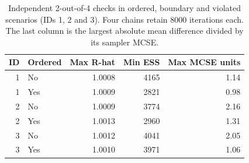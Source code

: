 \begin{table}[htbp]
\centering
\caption{Independent 2-out-of-4 checks in ordered, boundary and violated scenarios (IDs 1, 2 and 3). Four chains retain 8000 iterations each. The last column is the largest absolute mean difference divided by its sampler MCSE.}\label{tab:mcmc-extra}
\small
\begin{tabular}{rlrrr}
\toprule
ID & Ordered & Max R-hat & Min ESS & Max MCSE units \\
\midrule
1 & No & 1.0008 & 4165 & 1.14 \\
1 & Yes & 1.0009 & 2821 & 0.98 \\
2 & No & 1.0009 & 3774 & 2.16 \\
2 & Yes & 1.0013 & 2960 & 1.31 \\
3 & No & 1.0012 & 4041 & 2.05 \\
3 & Yes & 1.0010 & 3971 & 1.06 \\
\bottomrule
\end{tabular}
\end{table}
